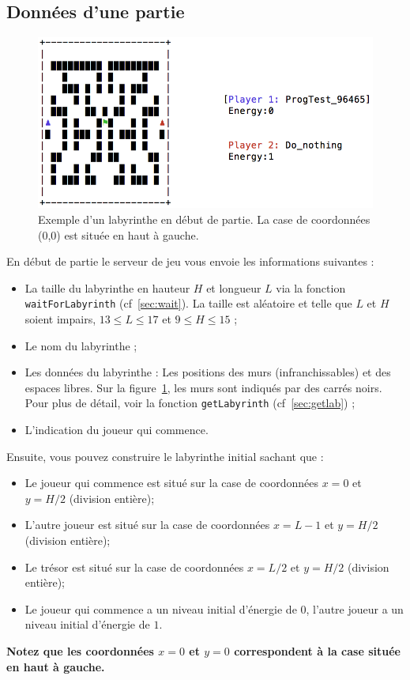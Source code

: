 \documentclass[french,12pt,a4paper,twoside,openright,titlepage]{report}
\begin{document}
\subsection{Données d'une partie}
\begin{figure}[h]
\includegraphics[width=\textwidth]{./laby-init.png}
\caption{\label{fig:init} Exemple d'un labyrinthe en début de partie. La case de coordonnées (0,0) est située en haut à gauche.}
\end{figure}
En début de partie le serveur de jeu vous envoie les informations suivantes :
\begin{itemize}
\item La taille du labyrinthe en hauteur $H$ et longueur $L$ via la fonction \verb|waitForLabyrinth| (cf~\ref{sec:wait}). La taille
est aléatoire et telle que $L$ et $H$ soient impairs, $13\leq L\leq 17$ et $9\leq H\leq 15$ ;
\item Le nom du labyrinthe ;
\item Les données du labyrinthe : Les positions des murs (infranchissables) et des espaces libres. Sur la figure~\ref{fig:init}, les murs sont indiqués par des carrés noirs. Pour plus de détail, voir la fonction \verb|getLabyrinth| (cf~\ref{sec:getlab}) ;
\item L'indication du joueur qui commence.
\end{itemize}

Ensuite, vous pouvez construire le labyrinthe initial sachant que :
\begin{itemize}
\item Le joueur qui commence est situé sur la case de coordonnées $x=0$ et $y=H/2$ (division entière);
\item L'autre joueur est situé sur la case de coordonnées $x=L-1$ et $y=H/2$ (division entière);
\item Le trésor est situé sur la case de coordonnées $x=L/2$ et $y=H/2$ (division entière);
\item Le joueur qui commence a un niveau initial d'énergie de $0$, l'autre joueur a un niveau initial d'énergie de $1$.
\end{itemize}
\textbf{Notez que les coordonnées $x=0$ et $y=0$ correspondent à la case située en haut à gauche.}
\end{document}
